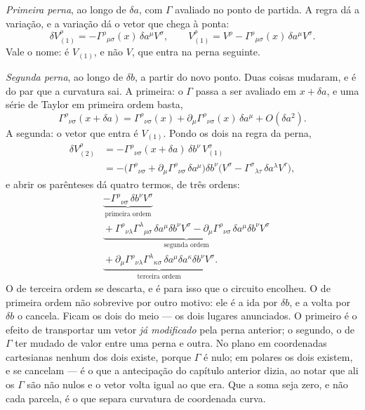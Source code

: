 \documentclass[12pt,a4paper,oneside]{book}
\theoremstyle{rgplain}
\theoremstyle{rgremark}
\begin{document}
\emph{Primeira perna}, ao longo de $\delta a$, com $\Gamma$ avaliado no ponto
de partida. A regra dá a variação, e a variação dá o vetor que chega à ponta:
\[
  \delta V^\rho_{(1)}=-\Gamma^\rho{}_{\mu\sigma}(x)\,\delta a^\mu V^\sigma ,
  \qquad
  V^\rho_{(1)}
  =V^\rho-\Gamma^\rho{}_{\mu\sigma}(x)\,\delta a^\mu V^\sigma .
\]
Vale o nome: é $V_{(1)}$, e não $V$, que entra na perna seguinte.

\emph{Segunda perna}, ao longo de $\delta b$, a partir do novo ponto. Duas
coisas mudaram, e é do par que a curvatura sai. A primeira: o $\Gamma$ passa
a ser avaliado em $x+\delta a$, e uma série de Taylor em primeira ordem
basta,
\[
  \Gamma^\rho{}_{\nu\sigma}(x+\delta a)
  =\Gamma^\rho{}_{\nu\sigma}(x)
  +\partial_\mu\Gamma^\rho{}_{\nu\sigma}(x)\,\delta a^\mu
  +O(\delta a^2) .
\]
A segunda: o vetor que entra é $V_{(1)}$. Pondo os dois na regra da
perna,
\begin{align*}
  \delta V^\rho_{(2)}
  &=-\Gamma^\rho{}_{\nu\sigma}(x+\delta a)\,\delta b^\nu\,
     V^\sigma_{(1)}\\
  &=-\bigl(\Gamma^\rho{}_{\nu\sigma}
    +\partial_\mu\Gamma^\rho{}_{\nu\sigma}\,\delta a^\mu\bigr)
    \delta b^\nu
    \bigl(V^\sigma-\Gamma^\sigma{}_{\lambda\tau}\,\delta a^\lambda
    V^\tau\bigr) ,
\end{align*}
e abrir os parênteses dá quatro termos, de três ordens:
\begin{align*}
  &\underbrace{-\Gamma^\rho{}_{\nu\sigma}\,\delta b^\nu V^\sigma}
    _{\text{primeira ordem}}\\
  &\underbrace{{}+\Gamma^\rho{}_{\nu\lambda}\Gamma^\lambda{}_{\mu\sigma}\,
     \delta a^\mu\delta b^\nu V^\sigma
   -\partial_\mu\Gamma^\rho{}_{\nu\sigma}\,
     \delta a^\mu\delta b^\nu V^\sigma}_{\text{segunda ordem}}\\
  &\underbrace{{}+\partial_\mu\Gamma^\rho{}_{\nu\lambda}
     \Gamma^\lambda{}_{\kappa\sigma}\,
     \delta a^\mu\delta a^\kappa\delta b^\nu V^\sigma}
    _{\text{terceira ordem}} .
\end{align*}
O de terceira ordem se descarta, e é para isso que o circuito encolheu. O de
primeira ordem não sobrevive por outro motivo: ele é a ida por $\delta b$, e
a volta por $\delta b$ o cancela. Ficam os dois do meio --- os dois lugares
anunciados. O primeiro é o efeito de transportar um vetor \emph{já
modificado} pela perna anterior; o segundo, o de $\Gamma$ ter mudado de valor
entre uma perna e outra. No plano em coordenadas cartesianas nenhum dos dois
existe, porque $\Gamma$ é nulo; em polares os dois existem, e se cancelam
--- é o que a antecipação do capítulo anterior dizia, ao notar que ali os
$\Gamma$ são não nulos e o vetor volta igual ao que era. Que a soma seja
zero, e não cada parcela, é o que separa curvatura de coordenada curva.
\end{document}

